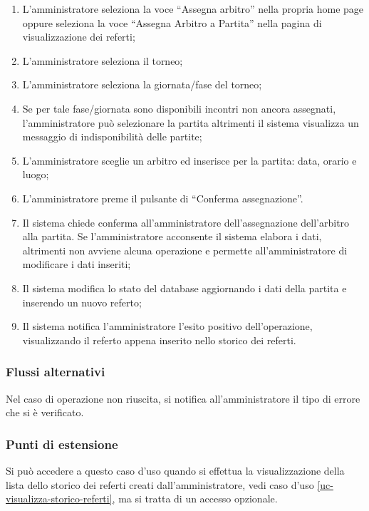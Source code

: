 \begin{enumerate}
	
	\item
	L'amministratore seleziona la voce ``Assegna arbitro'' nella propria home page oppure seleziona la voce ``Assegna Arbitro a Partita'' nella pagina di visualizzazione dei referti;
	
	\item
	L'amministratore seleziona il torneo;
	
	\item
	L'amministratore seleziona la giornata/fase del torneo;
	
	\item
	Se per tale fase/giornata sono disponibili incontri non ancora assegnati, l'amministratore può selezionare la partita altrimenti il sistema visualizza un messaggio di indisponibilità delle partite;
	
	\item
	L'amministratore sceglie un arbitro ed inserisce per la partita: data, orario e luogo;
	
	\item
	L'amministratore preme il pulsante di ``Conferma assegnazione''.
	
	\item
	Il sistema chiede conferma all'amministratore dell'assegnazione dell'arbitro alla partita. Se l'amministratore acconsente il sistema elabora i dati, altrimenti non avviene alcuna operazione e permette all'amministratore di modificare i dati inseriti;
	
	\item
	Il sistema modifica lo stato del database aggiornando i dati della partita e inserendo un nuovo referto;
	
	\item
	Il sistema notifica l'amministratore l'esito positivo dell'operazione, visualizzando il referto appena inserito nello storico dei referti. 
	
\end{enumerate}

\subsubsection*{Flussi alternativi}
Nel caso di operazione non riuscita, si notifica all'amministratore il tipo di errore che si è verificato.

\subsubsection*{Punti di estensione}
Si può accedere a questo caso d'uso quando si effettua la visualizzazione della lista dello storico dei referti creati dall'amministratore, vedi caso d'uso \vref{uc-visualizza-storico-referti}, ma si tratta di un accesso opzionale.